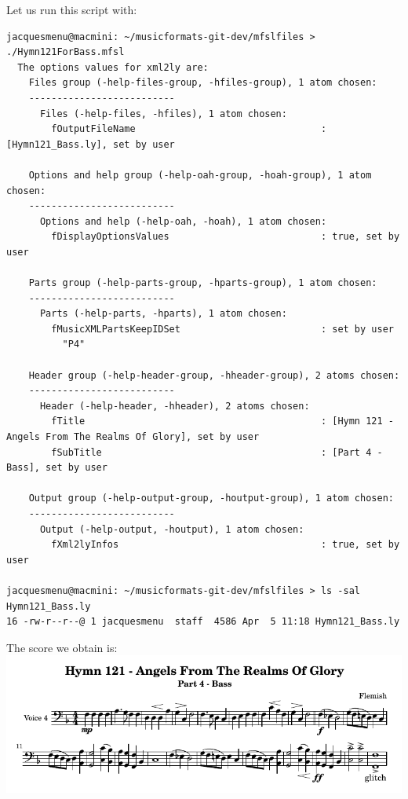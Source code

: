 Let us run this script with:
\begin{lstlisting}[language=Terminal]
jacquesmenu@macmini: ~/musicformats-git-dev/mfslfiles > ./Hymn121ForBass.mfsl
  The options values for xml2ly are:
    Files group (-help-files-group, -hfiles-group), 1 atom chosen:
    --------------------------
      Files (-help-files, -hfiles), 1 atom chosen:
        fOutputFileName                                 : [Hymn121_Bass.ly], set by user

    Options and help group (-help-oah-group, -hoah-group), 1 atom chosen:
    --------------------------
      Options and help (-help-oah, -hoah), 1 atom chosen:
        fDisplayOptionsValues                           : true, set by user

    Parts group (-help-parts-group, -hparts-group), 1 atom chosen:
    --------------------------
      Parts (-help-parts, -hparts), 1 atom chosen:
        fMusicXMLPartsKeepIDSet                         : set by user
          "P4"

    Header group (-help-header-group, -hheader-group), 2 atoms chosen:
    --------------------------
      Header (-help-header, -hheader), 2 atoms chosen:
        fTitle                                          : [Hymn 121 - Angels From The Realms Of Glory], set by user
        fSubTitle                                       : [Part 4 - Bass], set by user

    Output group (-help-output-group, -houtput-group), 1 atom chosen:
    --------------------------
      Output (-help-output, -houtput), 1 atom chosen:
        fXml2lyInfos                                    : true, set by user

jacquesmenu@macmini: ~/musicformats-git-dev/mfslfiles > ls -sal Hymn121_Bass.ly
16 -rw-r--r--@ 1 jacquesmenu  staff  4586 Apr  5 11:18 Hymn121_Bass.ly
\end{lstlisting}

The score we obtain is:\\
\includegraphics[scale=0.8]{../graphics/Hymn121_Bass.png}


